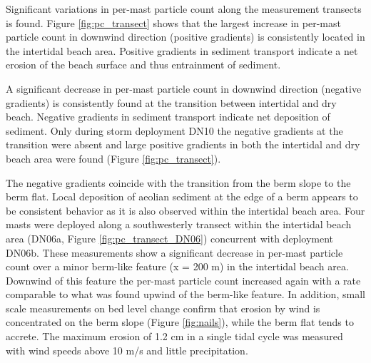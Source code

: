 Significant variations in per-mast particle count along the
measurement transects is found. Figure \ref{fig:pc_transect} shows
that the largest increase in per-mast particle count in downwind
direction (positive gradients) is consistently located in the
intertidal beach area. Positive gradients in sediment transport
indicate a net erosion of the beach surface and thus entrainment of
sediment. 

A significant decrease in per-mast particle count in downwind
direction (negative gradients) is consistently found at the transition
between intertidal and dry beach. Negative gradients in sediment
transport indicate net deposition of sediment. Only during storm
deployment DN10 the negative gradients at the transition were absent
and large positive gradients in both the intertidal and dry beach area
were found (Figure \ref{fig:pc_transect}).

The negative gradients coincide with the transition from the berm
slope to the berm flat. Local deposition of aeolian sediment at the
edge of a berm appears to be consistent behavior as it is also
observed within the intertidal beach area. Four masts were deployed
along a southwesterly transect within the intertidal beach area
(DN06a, Figure \ref{fig:pc_transect_DN06}) concurrent with deployment
DN06b. These measurements show a significant decrease in per-mast
particle count over a minor berm-like feature (x = 200 m) in the
intertidal beach area. Downwind of this feature the per-mast particle
count increased again with a rate comparable to what was found upwind
of the berm-like feature. In addition, small scale measurements on bed
level change confirm that erosion by wind is concentrated on the berm
slope (Figure \ref{fig:nails}), while the berm flat tends to
accrete. The maximum erosion of 1.2 cm in a single tidal cycle was
measured with wind speeds above 10 m/s and little precipitation.

